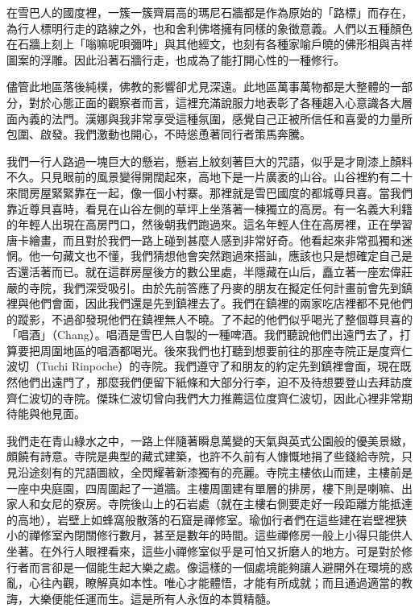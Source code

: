 在雪巴人的國度裡，一簇一簇齊肩高的瑪尼石牆都是作為原始的「路標」而存在，為行人標明行走的路線之外，也和舍利佛塔擁有同樣的象徵意義。人們以五種顏色在石牆上刻上「嗡嘛呢唄彌吽」與其他經文，也刻有各種家喻戶曉的佛形相與吉祥圖案的浮雕。因此沿著石牆行走，也成為了能打開心性的一種修行。

儘管此地區落後純樸，佛教的影響卻尤見深遠。此地區萬事萬物都是大整體的一部分，對於心態正面的觀察者而言，這裡充滿說服力地表彰了各種趨入心意識各大層面內義的法門。漢娜與我非常享受這種氛圍，感覺自己正被所信任和喜愛的力量所包圍、啟發。我們激動也開心，不時慫恿著同行者策馬奔騰。

我們一行人路過一塊巨大的懸岩，懸岩上紋刻著巨大的咒語，似乎是才剛漆上顏料不久。只見眼前的風景變得開闊起來，高地下是一片廣袤的山谷。山谷裡約有二十來間房屋緊緊靠在一起，像一個小村寨。那裡就是雪巴國度的都城尊貝喜。當我們靠近尊貝喜時，看見在山谷左側的草坪上坐落著一棟獨立的高房。有一名義大利籍的年輕人出現在高房門口，然後朝我們跑過來。這名年輕人住在高房裡，正在學習唐卡繪畫，而且對於我們一路上碰到甚麼人感到非常好奇。他看起來非常孤獨和迷惘。他一句藏文也不懂，我們猜想他會突然跑過來搭訕，應該也只是想確定自己是否還活著而已。就在這群房屋後方的數公里處，半隱藏在山后，矗立著一座宏偉莊嚴的寺院，我們深受吸引。由於先前答應了丹麥的朋友在擬定任何計畫前會先到鎮裡與他們會面，因此我們還是先到鎮裡去了。我們在鎮裡的兩家吃店裡都不見他們的蹤影，不過卻發現他們在鎮裡無人不曉。了不起的他們似乎喝光了整個尊貝喜的「唱酒」（Chang）。唱酒是雪巴人自製的一種啤酒。我們聽說他們出遠門去了，打算要把周圍地區的唱酒都喝光。後來我們也打聽到想要前往的那座寺院正是度齊仁波切（Tuchi
Rinpoche）的寺院。我們遵守了和朋友的約定先到鎮裡會面，現在既然他們出遠門了，那麼我們便留下紙條和大部分行李，迫不及待想要登山去拜訪度齊仁波切的寺院。傑珠仁波切曾向我們大力推薦這位度齊仁波切，因此心裡非常期待能與他見面。

我們走在青山綠水之中，一路上伴隨著瞬息萬變的天氣與英式公園般的優美景緻，頗饒有詩意。寺院是典型的藏式建築，也許不久前有人慷慨地捐了些錢給寺院，只見沿途刻有的咒語圖紋，全閃耀著新漆獨有的亮麗。寺院主樓依山而建，主樓前是一座中央庭園，四周圍起了一道牆。主樓周圍建有單層的排房，樓下則是喇嘛、出家人和女尼的寮房。寺院後山上的石岩處（就在主樓右側要走好一段距離方能抵達的高地），岩壁上如蜂窩般散落的石窟是禪修室。瑜伽行者們在這些建在岩壁裡狹小的禪修室內閉關修行數月，甚至是數年的時間。這些禪修房一般上小得只能供人坐著。在外行人眼裡看來，這些小禪修室似乎是可怕又折磨人的地方。可是對於修行者而言卻是一個能生起大樂之處。像這樣的一個處境能夠讓人避開外在環境的惑亂，心往內觀，瞭解真如本性。唯心才能體悟，才能有所成就；而且通過適當的教誨，大樂便能任運而生。這是所有人永恆的本質精髓。

